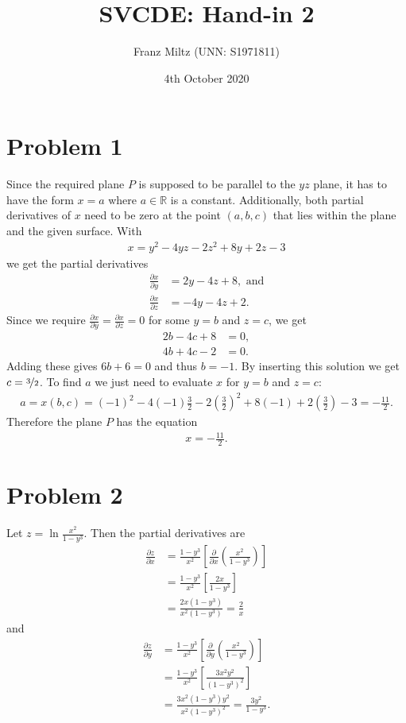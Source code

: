 \documentclass{article}
\title{SVCDE: Hand-in 2}
\author{Franz Miltz (UNN: S1971811)}
\newcommand{\R}{\mathbb{R}}
\newcommand{\p}{\partial }
\begin{document}
\date{4th October 2020}
\maketitle
\section*{Problem 1}
Since the required plane $P$ is supposed to be parallel to the $yz$ plane, it
has to have the form $x=a$ where $a\in\R$ is a constant.
Additionally, both partial derivatives of $x$ need to be zero at the
point $(a,b,c)$ that lies within the plane and the given surface.
With
\begin{align*}
  x = y^2 - 4yz - 2z^2 + 8y + 2z -3
\end{align*}
we get the partial derivatives
\begin{align*}
  \frac{\p x}{\p y}&=2y - 4z + 8,\text{ and}\\
  \frac{\p x}{\p z}&=-4y-4z+2.
\end{align*}
Since we require $\frac{\p x}{\p y}=\frac{\p x}{\p z}=0$ for
some $y=b$ and $z=c$, we get
\begin{align*}
  2b - 4c + 8 &= 0,\\
  4b + 4c - 2 &= 0.
\end{align*}
Adding these gives $6b + 6 = 0$ and thus $b=-1$.
By inserting this solution we get $c=\nicefrac{3}{2}$. 
To find $a$ we just need to evaluate $x$ for $y=b$ and $z=c$:
\begin{align*}
  a = x(b,c) = (-1)^2 - 4(-1)\frac{3}{2} - 2\left(\frac{3}{2}\right)^2
      + 8(-1) + 2\left(\frac{3}{2}\right) - 3 = - \frac{11}{2}. 
\end{align*}
Therefore the plane $P$ has the equation
\begin{align*}
  x = -\frac{11}{2}.
\end{align*}
\section*{Problem 2}
Let $ z = \ln\frac{x^2}{1-y^3}$. Then the partial derivatives are
\begin{align*}
  \frac{\p z}{\p x}
  &=\frac{1-y^3}{x^2}\left[\frac{\p}{\p x}\left(\frac{x^2}{1-y^3}\right)\right]\\
  &=\frac{1-y^3}{x^2}\left[\frac{2x}{1-y^3}\right]\\
  &=\frac{2x(1-y^3)}{x^2(1-y^3)}=\frac{2}{x}
\end{align*}
and
\begin{align*}
  \frac{\p z}{\p y}
  &=\frac{1-y^3}{x^2}\left[\frac{\p}{\p y}\left( \frac{x^2}{1-y^3}\right)\right]\\
  &=\frac{1-y^3}{x^2}\left[\frac{3x^2y^2}{(1-y^3)^2}\right]\\
  &=\frac{3x^2(1-y^3)y^2}{x^2(1-y^3)^2} =\frac{3y^2}{1-y^3}.
\end{align*}
\end{document}
